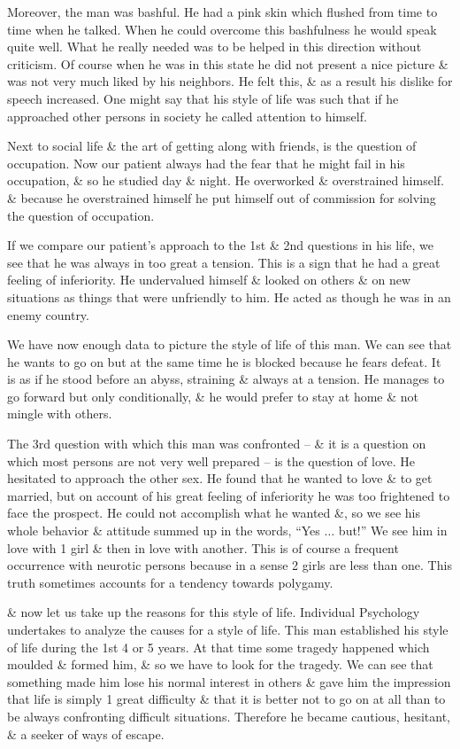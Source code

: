 \documentclass{article}
\begin{document}
Moreover, the man was bashful. He had a pink skin which flushed from time to time when he talked. When he could overcome this bashfulness he would speak quite well. What he really needed was to be helped in this direction without criticism. Of course when he was in this state he did not present a nice picture \& was not very much liked by his neighbors. He felt this, \& as a result his dislike for speech increased. One might say that his style of life was such that if he approached other persons in society he called attention to himself.

Next to social life \& the art of getting along with friends, is the question of occupation. Now our patient always had the fear that he might fail in his occupation, \& so he studied day \& night. He overworked \& overstrained himself. \& because he overstrained himself he put himself out of commission for solving the question of occupation.

If we compare our patient's approach to the 1st \& 2nd questions in his life, we see that he was always in too great a tension. This is a sign that he had a great feeling of inferiority. He undervalued himself \& looked on others \& on new situations as things that were unfriendly to him. He acted as though he was in an enemy country.

We have now enough data to picture the style of life of this man. We can see that he wants to go on but at the same time he is blocked because he fears defeat. It is as if he stood before an abyss, straining \& always at a tension. He manages to go forward but only conditionally, \& he would prefer to stay at home \& not mingle with others.

The 3rd question with which this man was confronted -- \& it is a question on which most persons are not very well prepared -- is the question of love. He hesitated to approach the other sex. He found that he wanted to love \& to get married, but on account of his great feeling of inferiority he was too frightened to face the prospect. He could not accomplish what he wanted \&, so we see his whole behavior \& attitude summed up in the words, ``Yes $\ldots$ but!'' We see him in love with 1 girl \& then in love with another. This is of course a frequent occurrence with neurotic persons because in a sense 2 girls are less than one. This truth sometimes accounts for a tendency towards polygamy.

\& now let us take up the reasons for this style of life. Individual Psychology undertakes to analyze the causes for a style of life. This man established his style of life during the 1st 4 or 5 years. At that time some tragedy happened which moulded \& formed him, \& so we have to look for the tragedy. We can see that something made him lose his normal interest in others \& gave him the impression that life is simply 1 great difficulty \& that it is better not to go on at all than to be always confronting difficult situations. Therefore he became cautious, hesitant, \& a seeker of ways of escape.
\end{document}
